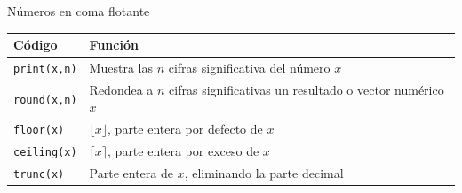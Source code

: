 \documentclass[
  ignorenonframetext,
]{beamer}
\begin{document}
\begin{frame}[fragile]{Números en coma flotante}
\protect\hypertarget{nuxfameros-en-coma-flotante}{}

\begin{longtable}[]{@{}ll@{}}
\toprule
\begin{minipage}[b]{0.24\columnwidth}\raggedright
Código\strut
\end{minipage} & \begin{minipage}[b]{0.70\columnwidth}\raggedright
Función\strut
\end{minipage}\tabularnewline
\midrule
\endhead
\begin{minipage}[t]{0.24\columnwidth}\raggedright
\texttt{print(x,n)}\strut
\end{minipage} & \begin{minipage}[t]{0.70\columnwidth}\raggedright
Muestra las \(n\) cifras significativa del número \(x\)\strut
\end{minipage}\tabularnewline
\begin{minipage}[t]{0.24\columnwidth}\raggedright
\texttt{round(x,n)}\strut
\end{minipage} & \begin{minipage}[t]{0.70\columnwidth}\raggedright
Redondea a \(n\) cifras significativas un resultado o vector numérico
\(x\)\strut
\end{minipage}\tabularnewline
\begin{minipage}[t]{0.24\columnwidth}\raggedright
\texttt{floor(x)}\strut
\end{minipage} & \begin{minipage}[t]{0.70\columnwidth}\raggedright
\(\lfloor x\rfloor\), parte entera por defecto de \(x\)\strut
\end{minipage}\tabularnewline
\begin{minipage}[t]{0.24\columnwidth}\raggedright
\texttt{ceiling(x)}\strut
\end{minipage} & \begin{minipage}[t]{0.70\columnwidth}\raggedright
\(\lceil x\rceil\), parte entera por exceso de \(x\)\strut
\end{minipage}\tabularnewline
\begin{minipage}[t]{0.24\columnwidth}\raggedright
\texttt{trunc(x)}\strut
\end{minipage} & \begin{minipage}[t]{0.70\columnwidth}\raggedright
Parte entera de \(x\), eliminando la parte decimal\strut
\end{minipage}\tabularnewline
\bottomrule
\end{longtable}

\end{frame}
\end{document}
